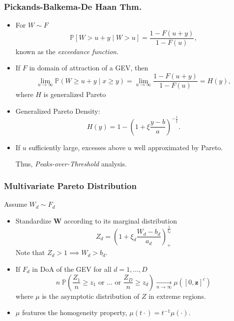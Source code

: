 \documentclass[aspectratio=169,10pt]{beamer}
\begin{document}
\begin{frame}
    \frametitle{Pickands-Balkema-De Haan Thm.}  
    {\small
    \citet{pickands1975,balkema1974}
    \begin{itemize}
    \item For $W\sim F$
    \[
        \mathbb{P}\left[W > u + y\mid W > u\right] 
            = \frac{1 - F(u + y)}{1 - F(u)},
    \]
        known as the \emph{exceedance function}.
    \item If $F$ in domain of attraction of a GEV, then
    \[
        \lim\limits_{u\to\infty}\mathbb{P}\left(W \geq u + y \mid x \geq y\right)
        = \lim\limits_{u\to\infty}\frac{1 - F(u + y)}{1 - F(u)} = H(y),
    \]
        where $H$ is generalized Pareto
    \item Generalized Pareto Density:
    \[
        H(y) = 1 - \left(1 + \xi\frac{y - b}{a}\right)^{-\frac{1}{\xi}}.
    \]
    \item If $u$ sufficiently large, excesses above $u$ well approximated by Pareto.
    
    Thus, \emph{Peaks-over-Threshold} analysis.
    \end{itemize}
    }
\end{frame} %

\begin{frame}
    \frametitle{Multivariate Pareto Distribution}
    Assume $W_d \sim F_d$
    \begin{itemize}
    \item Standardize $\bm{W}$ according to its marginal distribution
    \[
        Z_d = \left(1 + \xi_d\frac{W_d - b_d}{a_d}\right)_+^{\frac{1}{\xi_d}}
    \]
        Note that $Z_d > 1 \implies W_d > b_d$.
    \item If $F_d$ in DoA of the GEV for all $d = 1,\ldots,D$
    \[
    n\;\mathbb{P}\left(
        \frac{Z_1}{n} \geq z_1 \text{ or }\ldots\text{ or }\frac{Z_D}{n} \geq z_d
        \right) \xrightarrow[n\to\infty]{} \mu\left([0,\bm{z}]^c\right)
    \]
    where $\mu$ is the asymptotic distribution of $Z$ in extreme regions.
    \item $\mu$ features the homogeneity property, $\mu(t\cdot) = t^{-1}\mu(\cdot)$.
    \end{itemize}
\end{frame} %
\end{document}
